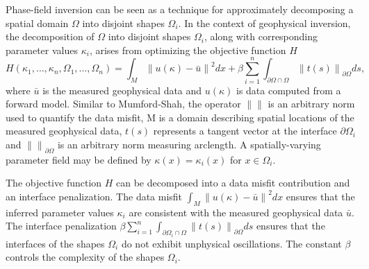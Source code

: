 \documentclass[manuscript,revised]{geophysics}
\newcommand\norm[1]{\left\lVert#1\right\rVert}
\begin{document}
Phase-field inversion can be seen as a technique for approximately decomposing a spatial domain $\Omega$ into disjoint shapes $\Omega_i$.  In the context of geophysical inversion, the decomposition of $\Omega$ into disjoint shapes $\Omega_i$, along with corresponding parameter values $\kappa_i$, arises from optimizing the objective function $H$
\begin{equation} \label{eq:pf}
H \left( \kappa_1,…,\kappa_n, \Omega_1,…,\Omega_n \right) = \int_M \norm{u(\kappa)-\bar{u}}^2 dx+ \beta \sum_{i=1}^n \int_{\partial\Omega \cap \Omega} \norm{t(s)}_{\partial\Omega} ds ,
\end{equation}
where $\bar{u}$ is the measured geophysical data and $u(\kappa)$ is data computed from a forward model.  Similar to Mumford-Shah, the operator $\norm{}$ is an arbitrary norm used to quantify the data misfit, M is a domain describing spatial locations of the measured geophysical data, $t(s)$ represents a tangent vector at the interface $\partial\Omega_i$ and $\norm{}_{\partial\Omega}$  is an arbitrary norm measuring arclength. A spatially-varying parameter field may be defined by $\kappa(x)=\kappa_i (x)$ for $x \in \Omega_i$.  

The objective function $H$ can be decomposed into a data misfit contribution and an interface penalization. The data misfit $\int_M \norm{u(\kappa)-\bar{u}}^2  dx$
ensures that the inferred parameter values $\kappa_i$ are consistent with the measured geophysical data $\bar{u}$. The interface penalization 
$\beta \sum_{i=1}^n \int_{\partial\Omega_i \cap \Omega} \norm{t(s)}_{\partial\Omega}  ds$
ensures that the interfaces of the shapes $\Omega_i$ do not exhibit unphysical oscillations. The constant $\beta$ controls the complexity of the shapes $\Omega_i$.

\end{document}
